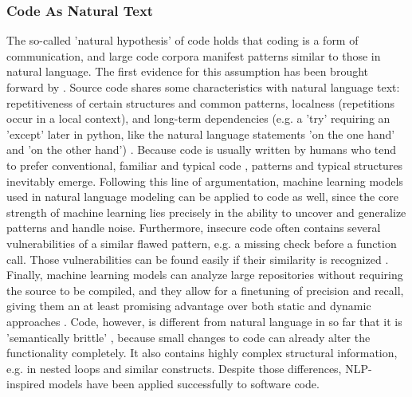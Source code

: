 \documentclass[
	a4paper,
	pagesize,
	pdftex,
	12pt,
	twoside, %
	BCOR=5mm, %
	ngerman,
	fleqn,
	final,
	]{scrartcl}
\begin{document}
\subsubsection{Code As Natural Text}\label{Natural-Hypothesis}\label{Semantically-Brittle}
The so-called 'natural hypothesis' of code holds that coding is a form of communication, and large code corpora manifest patterns similar to those in natural language. The first evidence for this assumption has been brought forward by \cite{Hindle.2012}.
Source code shares some characteristics with natural language text: repetitiveness of certain structures and common patterns, localness (repetitions occur in a local context), and long-term dependencies (e.g. a 'try' requiring an 'except' later in python, like the natural language statements 'on the one hand' and 'on the other hand') \cite{Dam.2016}.
Because code is usually written by humans who tend to prefer conventional, familiar and typical code \cite{Allamanis.2018}, patterns and typical structures inevitably emerge. Following this line of argumentation, machine learning models used in natural language modeling can be applied to code as well, since the core strength of machine learning lies precisely in the ability to uncover and generalize patterns and handle noise. Furthermore, insecure code often contains several vulnerabilities of a similar flawed pattern, e.g. a missing check before a function call. Those vulnerabilities can be found easily if their similarity is recognized \cite{Yamaguchi.2012}. Finally, machine learning models can analyze large repositories without requiring the source to be compiled, and they allow for a finetuning of precision and recall, giving them an at least promising advantage over both static and dynamic approaches \cite{Russell.2018}.
Code, however, is different from natural language in so far that it is 'semantically brittle' \cite{Allamanis.2018}, because small changes to code can already alter the functionality completely. It also contains highly complex structural information, e.g. in nested loops and similar constructs. Despite those differences, NLP-inspired models have been applied successfully to software code.
\end{document}
